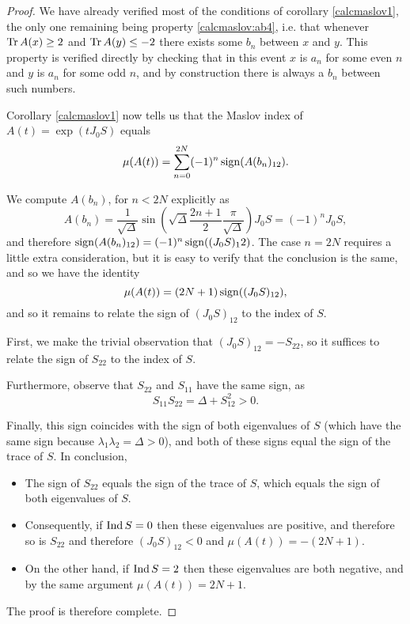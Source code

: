 \begin{proof}
We have already verified most of the conditions of corollary \ref{calcmaslov1}, the only one remaining being property \ref{calcmaslov:ab4}, i.e. that whenever $\operatorname{Tr} A(x) \geq 2$ and $\operatorname{Tr} A(y) \leq -2$ there exists some $b_n$ between $x$ and $y$. This property is verified directly by checking that in this event $x$ is $a_n$ for some even $n$ and $y$ is $a_n$ for some odd $n$, and by construction there is always a $b_n$ between such numbers.

Corollary \ref{calcmaslov1} now tells us that the Maslov index of $A(t) = \exp(t J_0 S)$ equals
\begin{equation}
\mu(A(t)) = \sum_{n = 0}^{2N} (-1)^n \operatorname{sign}(A(b_n)_{12}).
\end{equation}

We compute $A(b_n)$, for $n < 2N$ explicitly as
\begin{equation}
A(b_n) = \frac1{\sqrt\Delta} \sin\left( \sqrt\Delta \frac{2n + 1}2 \frac\pi{\sqrt\Delta} \right) J_0 S = (-1)^n J_0 S,
\end{equation}
and therefore $\operatorname{sign}(A(b_n)_{12}) = (-1)^n \operatorname{sign}((J_0 S)_12)$. The case $n = 2N$ requires a little extra consideration, but it is easy to verify that the conclusion is the same, and so we have the identity
\begin{equation}
\mu(A(t)) = (2N+1) \operatorname{sign}((J_0 S)_{12}),
\end{equation}
and so it remains to relate the sign of $(J_0 S)_{12}$ to the index of $S$.

First, we make the trivial observation that $(J_0 S)_{12} = - S_{22}$, so it suffices to relate the sign of $S_{22}$ to the index of $S$.

Furthermore, observe that $S_{22}$ and $S_{11}$ have the same sign, as
\begin{equation}
S_{11} S_{22} = \Delta + S_{12}^2 > 0.
\end{equation}

Finally, this sign coincides with the sign of both eigenvalues of $S$ (which have the same sign because $\lambda_1 \lambda_2 = \Delta > 0$), and both of these signs equal the sign of the trace of $S$. In conclusion,
\begin{itemize}
\item The sign of $S_{22}$ equals the sign of the trace of $S$, which equals the sign of both eigenvalues of $S$.
\item Consequently, if $\operatorname{Ind} S = 0$ then these eigenvalues are positive, and therefore so is $S_{22}$ and therefore $(J_0 S)_{12} < 0$ and $\mu(A(t)) = -(2N+1)$.
\item On the other hand, if $\operatorname{Ind} S = 2$ then these eigenvalues are both negative, and by the same argument $\mu(A(t)) = 2N+1$.
\end{itemize}

The proof is therefore complete.
\end{proof}

